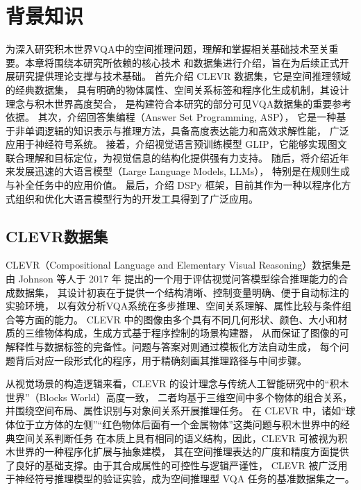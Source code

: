 \newtheorem{definition}{定义}[section]
\newtheorem{example}{例}[section]
\chapter{背景知识}
为深入研究积木世界VQA中的空间推理问题，理解和掌握相关基础技术至关重要。本章将围绕本研究所依赖的核心技术
和数据集进行介绍，旨在为后续正式开展研究提供理论支撑与技术基础。
首先介绍 CLEVR 数据集，它是空间推理领域的经典数据集，
具有明确的物体属性、空间关系标签和程序化生成机制，其设计理念与积木世界高度契合，
是构建符合本研究的部分可见VQA数据集的重要参考依据。
其次，介绍回答集编程（Answer Set Programming, ASP），
它是一种基于非单调逻辑的知识表示与推理方法，具备高度表达能力和高效求解性能，
广泛应用于神经符号系统。
接着，介绍视觉语言预训练模型 GLIP，它能够实现图文联合理解和目标定位，为视觉信息的结构化提供强有力支持。
随后，将介绍近年来发展迅速的大语言模型（Large Language Models, LLMs），
特别是在规则生成与补全任务中的应用价值。
最后，介绍 DSPy 框架，目前其作为一种以程序化方式组织和优化大语言模型行为的开发工具得到了广泛应用。
\section{CLEVR数据集}
CLEVR（Compositional Language and Elementary Visual Reasoning）数据集是由 Johnson 等人于 2017 年
提出的一个用于评估视觉问答模型综合推理能力的合成数据集\cite{johnson2017clevr}，
其设计初衷在于提供一个结构清晰、控制变量明确、便于自动标注的实验环境，
以有效分析VQA系统在多步推理、空间关系理解、属性比较与条件组合等方面的能力。
CLEVR 中的图像由多个具有不同几何形状、颜色、大小和材质的三维物体构成，生成方式基于程序控制的场景构建器，
从而保证了图像的可解释性与数据标签的完备性。问题与答案对则通过模板化方法自动生成，
每个问题背后对应一段形式化的程序，用于精确刻画其推理路径与中间步骤。

从视觉场景的构造逻辑来看，CLEVR 的设计理念与传统人工智能研究中的“积木世界”（\-Blocks World）高度一致，
二者均基于三维空间中多个物体的组合关系，并围绕空间布局、属性识别与对象间关系开展推理任务。
在 CLEVR 中，诸如“球体位于立方体的左侧”“红色物体后面有一个金属物体”这类问题与积木世界中的经典空间关系判断任务
在本质上具有相同的语义结构，因此，CLEVR 可被视为积木世界的一种程序化扩展与抽象建模，
其在空间推理表达的广度和精度方面提供了良好的基础支撑。由于其合成属性的可控性与逻辑严谨性，
CLEVR 被广泛用于神经符号推理模型的验证实验，成为空间推理型 VQA 任务的基准数据集之一。

